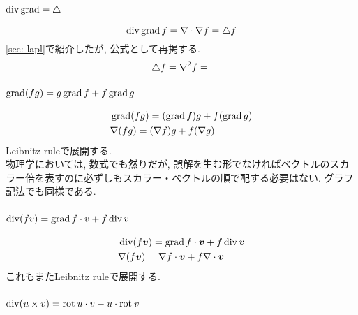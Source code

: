 \documentclass[dvipdfmx]{jsarticle}
\begin{document}
\subsubsection{$\operatorname{\mathrm{div}}\operatorname{\mathrm{grad}}=\triangle$}

\begin{equation*}
    \operatorname{\mathrm{div}}\operatorname{\mathrm{grad}} f=\nabla\cdot\nabla f=\triangle f
\end{equation*}
\ref{sec: lapl}で紹介したが, 公式として再掲する.
\begin{equation*}
    \lapl f=\laplacian f
    =
    \vcenter{\hbox{}}
\end{equation*}


\subsubsection{$\operatorname{\mathrm{grad}}(fg)=g\operatorname{\mathrm{grad}} f+f\operatorname{\mathrm{grad}} g$}

\begin{align*}
    &\operatorname{\mathrm{grad}}(fg)=(\operatorname{\mathrm{grad}} f)g+f(\operatorname{\mathrm{grad}} g)
    \\
    &\nabla(fg)=(\nabla f)g+f(\nabla g)
\end{align*}
Leibnitz ruleで展開する.
\begin{equation*}
    
\end{equation*}
物理学においては, 数式でも然りだが, 誤解を生む形でなければベクトルのスカラー倍を表すのに必ずしもスカラー・ベクトルの順で配する必要はない.
グラフ記法でも同様である.


\subsubsection{$\operatorname{\mathrm{div}}(fv)=\operatorname{\mathrm{grad}} f\cdot v+f\operatorname{\mathrm{div}} v$}

\begin{align*}
    &\operatorname{\mathrm{div}}(f\bm{v})=\operatorname{\mathrm{grad}} f\cdot\bm{v}+f\operatorname{\mathrm{div}}\bm{v}
    \\
    &\nabla(f\bm{v})=\nabla f\cdot\bm{v}+f\nabla\cdot\bm{v}
\end{align*}
これもまたLeibnitz ruleで展開する.
\begin{equation*}
    
\end{equation*}


\subsubsection{$\operatorname{\mathrm{div}}(u\times v)=\mathrm{rot}\: u\cdot v-u\cdot\mathrm{rot}\: v$}
\label{sec: div uv}
\end{document}
